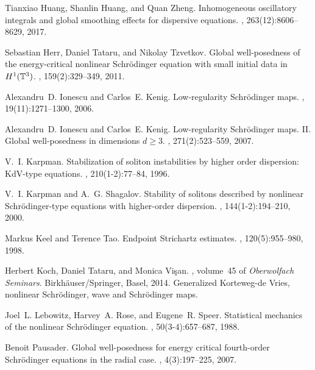 \documentclass[aihp]{imsart}
\numberwithin{equation}{section}
\theoremstyle{plain}
\theoremstyle{remark}
\begin{document}
\begin{thebibliography}{}
Tianxiao Huang, Shanlin Huang, and Quan Zheng.
\newblock Inhomogeneous oscillatory integrals and global smoothing effects for
  dispersive equations.
, 263(12):8606--8629, 2017.

Sebastian Herr, Daniel Tataru, and Nikolay Tzvetkov.
\newblock Global well-posedness of the energy-critical nonlinear
  {S}chr\"{o}dinger equation with small initial data in {$H^1(\Bbb T^3)$}.
, 159(2):329--349, 2011.

Alexandru~D. Ionescu and Carlos~E. Kenig.
\newblock Low-regularity {S}chr\"{o}dinger maps.
, 19(11):1271--1300, 2006.

Alexandru~D. Ionescu and Carlos~E. Kenig.
\newblock Low-regularity {S}chr\"{o}dinger maps. {II}. {G}lobal well-posedness
  in dimensions {$d\geq 3$}.
, 271(2):523--559, 2007.

V.~I. Karpman.
\newblock Stabilization of soliton instabilities by higher order dispersion:
  {K}d{V}-type equations.
, 210(1-2):77--84, 1996.

V.~I. Karpman and A.~G. Shagalov.
\newblock Stability of solitons described by nonlinear {S}chr\"{o}dinger-type
  equations with higher-order dispersion.
, 144(1-2):194--210, 2000.

Markus Keel and Terence Tao.
\newblock Endpoint {S}trichartz estimates.
, 120(5):955--980, 1998.

Herbert Koch, Daniel Tataru, and Monica Vi\c{s}an.
, volume~45 of {\em
  Oberwolfach Seminars}.
\newblock Birkh\"{a}user/Springer, Basel, 2014.
\newblock Generalized Korteweg-de Vries, nonlinear Schr\"{o}dinger, wave and
  Schr\"{o}dinger maps.

Joel~L. Lebowitz, Harvey~A. Rose, and Eugene~R. Speer.
\newblock Statistical mechanics of the nonlinear {S}chr\"{o}dinger equation.
, 50(3-4):657--687, 1988.

Benoit Pausader.
\newblock Global well-posedness for energy critical fourth-order
  {S}chr\"{o}dinger equations in the radial case.
, 4(3):197--225, 2007.


\end{thebibliography}
\end{document}
